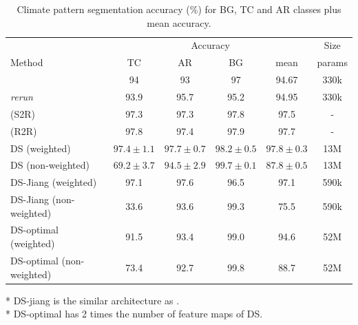 \documentclass{article} %
\begin{document}
\begin{table}

\begin{tabular}{l|c c c c c}
        \multicolumn{1}{l}{} & \multicolumn{4}{c}{Accuracy} & Size\\
        \cmidrule(lr){2-5} \cmidrule(lr){6-6}
        \multicolumn{1}{l}{Method} & TC & AR & BG & mean & params \\ \hline
        \cite{jiang2019sphericalcnn} & 94 & 93 & 97 & 94.67 & 330k\\
        \cite{jiang2019sphericalcnn} \emph{rerun} & 93.9 & 95.7 & 95.2 & 94.95 & 330k\\
        \cite{cohen2019gauge} (S2R) & 97.3 & 97.3 & 97.8 & 97.5 & -\\
        \cite{cohen2019gauge} (R2R) & 97.8 & 97.4 & 97.9 & 97.7 & -\\ \hline
        DS (weighted) & $97.4\pm 1.1$ & $97.7\pm 0.7$ & $98.2\pm 0.5$ & $97.8\pm 0.3$ & 13M\\
        DS (non-weighted) & $69.2\pm 3.7$ & $94.5\pm 2.9$ & $99.7\pm 0.1$ & $87.8\pm 0.5$ & 13M\\ \hline
        DS-Jiang (weighted) & 97.1 & 97.6 & 96.5 & 97.1 & 590k\\
        DS-Jiang (non-weighted) & 33.6 & 93.6 & 99.3 & 75.5 & 590k\\ \hline
        DS-optimal (weighted) & 91.5 & 93.4 & 99.0 & 94.6 & 52M\\
        DS-optimal (non-weighted) & 73.4 & 92.7 & 99.8 & 88.7 & 52M\\ \hline
    \end{tabular}
    \caption{Climate pattern segmentation accuracy (\%) for BG, TC
and AR classes plus mean accuracy.}
\end{table}

* DS-jiang is the similar architecture as \cite{jiang2019sphericalcnn}.\\
* DS-optimal has 2 times the number of feature maps of DS.\\
\end{document}
